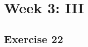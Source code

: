 \documentclass[a4paper]{article}
\let\stdsection\section
\renewcommand\section{\newpage\stdsection}
\begin{document}
\section*{Week 3: III}

\subsection*{Exercise 22}





\newpage
\end{document}
